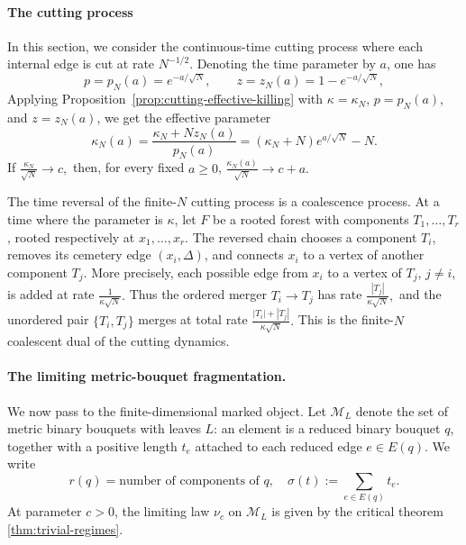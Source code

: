 \documentclass[11pt]{article}
\begin{document}
\paragraph{The cutting process}
In this section, we consider the continuous-time cutting process where each internal edge
is cut at rate \(N^{-1/2}\). Denoting the time parameter by $a$, one has
\[
p=p_N(a)=e^{-a/\sqrt N},
\qquad
z=z_N(a)=1-e^{-a/\sqrt N},
\]
Applying Proposition~\ref{prop:cutting-effective-killing} with
\(\kappa=\kappa_N\), \(p=p_N(a)\), and \(z=z_N(a)\), we get the effective
parameter
\[
\kappa_N(a)
=
\frac{\kappa_N+Nz_N(a)}{p_N(a)}
=
(\kappa_N+N)e^{a/\sqrt N}-N.
\]
If
$
\frac{\kappa_N}{\sqrt N}\longrightarrow c,
$
then, for every fixed \(a\ge0\),
\(
\frac{\kappa_N(a)}{\sqrt N}\longrightarrow c+a.
\)

The time reversal of the finite-\(N\) cutting process is a coalescence process. At a
time where the parameter is \(\kappa\), let \(F\) be a rooted forest with
components \(T_1,\dots,T_r\), rooted respectively at
\(x_1,\dots,x_r\). The reversed chain chooses a component \(T_i\), removes its
cemetery edge \((x_i,\Delta)\), and connects \(x_i\) to a vertex of another
component \(T_j\). More precisely, each possible edge from \(x_i\) to a vertex
of \(T_j\), \(j\ne i\), is added at rate
\(
\frac{1}{\kappa\sqrt N}.
\)
Thus the ordered merger \(T_i\to T_j\) has rate
\(
\frac{|T_j|}{\kappa\sqrt N},
\)
and the unordered pair \(\{T_i,T_j\}\) merges at total rate
\(
\frac{|T_i|+|T_j|}{\kappa\sqrt N}.
\)
This is the finite-\(N\) coalescent dual of the cutting dynamics.

\paragraph{The limiting metric-bouquet fragmentation.}

We now pass to the finite-dimensional marked object. Let \(\mathcal M_L\)
denote the set of metric binary bouquets with leaves \(L\): an element is a
reduced binary bouquet \(q\), together with a positive length \(t_e\) attached
to each reduced edge \(e\in E(q)\). We write
\[
r(q)=\text{number of components of }q,
\quad
\sigma(t):=\sum_{e\in E(q)}t_e .
\]
At parameter \(c>0\), the limiting law
\(\nu_c\) on \(\mathcal M_L\) is given by the critical theorem \ref{thm:trivial-regimes}.
\end{document}
